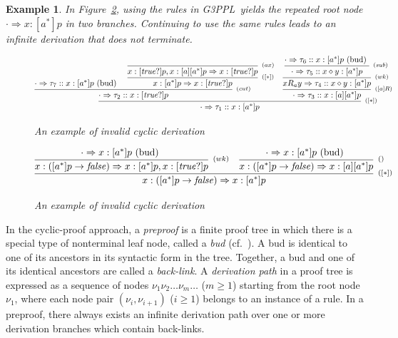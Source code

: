 \documentclass[manuscript,screen]{acmart}
\newtheorem{example}{Example}[section]
\newcommand{\true}[0]{\mathit{true}}
\newcommand{\false}[0]{\mathit{false}}
\DeclareMathOperator{\seq}{;}
\newcommand{\Sub}[0]{{\textit{sub}}}
\newcommand{\cat}[0]{\diamond}
\newcommand{\GiiiPPL}[0]{\mbox{G3PPL}}
\begin{document}
\begin{example}
    \label{ex:invalid cyclic derivation}
In Figure~\ref{figure:example of ill cyclic derivation}, using the rules in \GiiiPPL\ yields the repeated root node $\cdot \Rightarrow x:[a^*]p$ in two branches. 
Continuing to use the same rules leads to an infinite derivation that does not terminate. 

\begin{figure}
$$
\infer[^{([*])}]
{\cdot\Rightarrow \tau_1 :: x : [a^*]p}
{
        \infer[^{(cut)}]
        {\cdot \Rightarrow \tau_{2} :: x:[\true?]p}
        {
            \cdot \Rightarrow \tau_{7} :: x : [a^*]p\mbox{ (bud) }
            &
            \infer[^{([*])}]
            {x : [a^*]p\Rightarrow x : [\true?]p}
            {
                \infer[^{(ax)}]
                {x : [\true?]p, x : [a][a^*]p\Rightarrow x : [\true?]p}
                {}
            }
        }
        &
            \infer[^{([a]R)}]
            {\cdot\Rightarrow \tau_3 :: x:[a][a^*]p}
            {
                \infer[^{(wk)}]
                {x R_a y\Rightarrow \tau_4 :: x\cat y : [a^*]p}
                {
                    \infer[^{(\Sub)}]
                    {\cdot\Rightarrow \tau_5 :: x\cat y:[a^*]p}
                    {\cdot\Rightarrow \tau_6 :: x : [a^*]p \mbox{ (bud) }}
                }
            }
}
$$
\caption{An example of invalid cyclic derivation}
\label{figure:example of ill cyclic derivation}
\end{figure}

\ifx
\begin{figure}
$$
\infer[^{([*])}]
{x : ([a^*]p\to \false)\Rightarrow x : [a^*]p}
{
        \infer[^{(wk)}]
        {x : ([a^*]p\to \false)\Rightarrow x : [a^*]p, x : [\true?]p}
        {
            \cdot\Rightarrow x : [a^*]p \mbox{ (bud) }
        }
        &
        \infer[^{()}]
        {x : ([a^*]p\to \false)\Rightarrow x : [a][a^*]p}
        {
            \cdot\Rightarrow x : [a^*]p \mbox{ (bud) }
        }
}
$$
\caption{An example of invalid cyclic derivation}
\label{figure:example of ill cyclic derivation}
\end{figure}
\fi
\end{example}

In the cyclic-proof approach, a \emph{preproof} is a finite proof tree in which there is a special type of nonterminal leaf node, called a \emph{bud} (cf.~\cite{Brotherston07}). 
A bud is identical to one of its ancestors in its syntactic form in the tree. 
Together, a bud and one of its identical ancestors are called a \emph{back-link}. 
A \emph{derivation path} in a proof tree is expressed as a sequence of nodes $\nu_1\nu_2\ldots\nu_m\ldots$ ($m\ge 1$) starting from the root node $\nu_1$, 
where each node pair $(\nu_i, \nu_{i+1})$ ($i\ge 1$) belongs to an instance of a rule. 
In a preproof, there always exists an infinite derivation path over one or more derivation branches which contain back-links.
\end{document}
